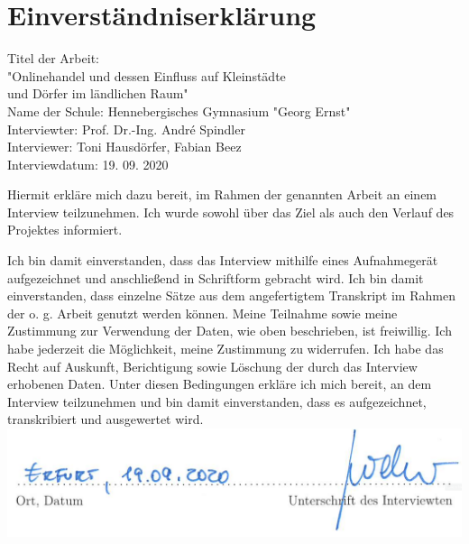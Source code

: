 \documentclass[a4paper, 12pt]{scrartcl}
\begin{document}
\normalsize









        \newpage
        
        
        
        
\section*{Einverständniserklärung}
\vfill\raggedright
Titel der Arbeit:\\ 
\raggedleft\vspace*{-0.63cm} "Onlinehandel und dessen Einfluss auf Kleinstädte\\
und Dörfer im ländlichen Raum"\\
Name der Schule: \hfill Hennebergisches Gymnasium "Georg Ernst"\\
Interviewter: \hfill Prof. Dr.-Ing. André Spindler\\
Interviewer: \hfill Toni Hausdörfer, Fabian Beez\\
Interviewdatum: \hfill 19. 09. 2020\\
\vfill\raggedright
Hiermit erkläre mich dazu bereit, im Rahmen der genannten Arbeit  an einem Interview teilzunehmen. Ich wurde sowohl über das Ziel als auch den Verlauf des Projektes informiert.

Ich bin damit einverstanden, dass das Interview mithilfe eines Aufnahmegerät aufgezeichnet und anschließend in Schriftform gebracht wird. Ich bin damit einverstanden, dass einzelne Sätze aus dem angefertigtem Transkript im Rahmen der o. g. Arbeit genutzt werden können. Meine Teilnahme sowie meine Zustimmung zur Verwendung der Daten, wie oben beschrieben, ist freiwillig. Ich habe jederzeit die Möglichkeit, meine Zustimmung zu widerrufen. Ich habe das Recht auf Auskunft, Berichtigung sowie Löschung der durch das Interview erhobenen Daten. Unter diesen Bedingungen erkläre ich mich bereit, an dem Interview teilzunehmen und bin damit einverstanden, dass es aufgezeichnet, transkribiert und ausgewertet wird.
\vfill
\hbox{\hspace{-0.95em} \includegraphics[scale=0.337]{media/unterschrift.png}}
\vfill
\vfill
\newpage

        
        
\end{document}
